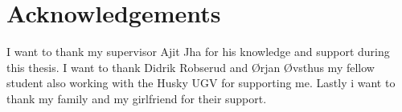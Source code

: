 \chapter*{Acknowledgements}
I want to thank my supervisor Ajit Jha for his knowledge and support during this thesis. I want to thank Didrik Robserud and Ørjan Øvsthus my fellow student also working with the Husky UGV for supporting me. Lastly i want to thank my family and my girlfriend for their support.  

